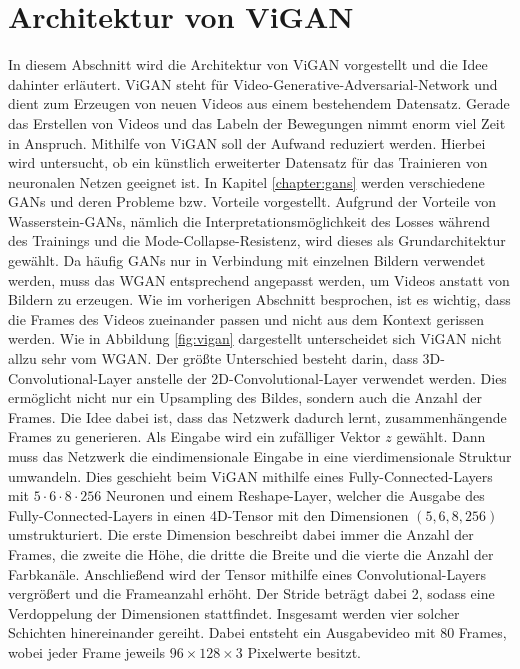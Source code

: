 \section{Architektur von ViGAN}
In diesem Abschnitt wird die Architektur von ViGAN vorgestellt und die
Idee dahinter erläutert. ViGAN steht für Video-Generative-Adversarial-Network
und dient zum Erzeugen von neuen Videos aus einem bestehendem Datensatz. Gerade
das Erstellen von Videos und das Labeln der Bewegungen nimmt enorm viel Zeit in
Anspruch. Mithilfe von ViGAN soll der Aufwand reduziert werden. Hierbei wird
untersucht, ob ein künstlich erweiterter Datensatz für das Trainieren von
neuronalen Netzen geeignet ist. In Kapitel \ref{chapter:gans} werden
verschiedene GANs und deren Probleme bzw. Vorteile vorgestellt. Aufgrund der
Vorteile von Wasserstein-GANs, nämlich die Interpretationsmöglichkeit des Losses
während des Trainings und die Mode-Collapse-Resistenz, wird dieses als
Grundarchitektur gewählt. Da häufig GANs nur in Verbindung mit einzelnen Bildern
verwendet werden, muss das WGAN entsprechend angepasst werden, um Videos anstatt
von Bildern zu erzeugen. Wie im vorherigen Abschnitt besprochen, ist es wichtig,
dass die Frames des Videos zueinander passen und nicht aus dem Kontext gerissen
werden. Wie in Abbildung \ref{fig:vigan} dargestellt unterscheidet sich ViGAN
nicht allzu sehr vom WGAN. Der größte Unterschied besteht darin, dass
3D-Convolutional-Layer anstelle der 2D-Convolutional-Layer verwendet werden.
Dies ermöglicht nicht nur ein Upsampling des Bildes, sondern auch die Anzahl der
Frames. Die Idee dabei ist, dass das Netzwerk dadurch lernt, zusammenhängende
Frames zu generieren. Als Eingabe wird ein zufälliger Vektor $z$ gewählt. Dann
muss das Netzwerk die eindimensionale Eingabe in eine vierdimensionale Struktur
umwandeln. Dies geschieht beim ViGAN mithilfe eines Fully-Connected-Layers mit
$5 \cdot 6 \cdot 8 \cdot 256$ Neuronen und einem Reshape-Layer, welcher die
Ausgabe des Fully-Connected-Layers in einen 4D-Tensor mit den Dimensionen $(5,
6, 8, 256)$ umstrukturiert. Die erste Dimension beschreibt dabei immer die
Anzahl der Frames, die zweite die Höhe, die dritte die Breite und die vierte die
Anzahl der Farbkanäle. Anschließend wird der Tensor mithilfe eines
Convolutional-Layers vergrößert und die Frameanzahl erhöht. Der Stride beträgt
dabei 2, sodass eine Verdoppelung der Dimensionen stattfindet. Insgesamt werden
vier solcher Schichten hinereinander gereiht. Dabei entsteht ein Ausgabevideo
mit 80 Frames, wobei jeder Frame jeweils $96 \times 128 \times 3$ Pixelwerte
besitzt.

